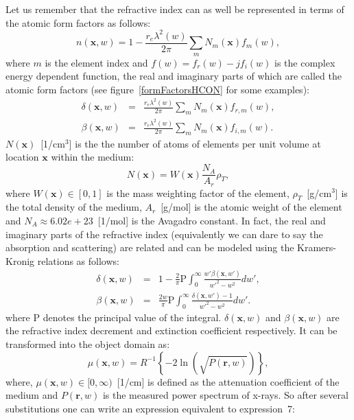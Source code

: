 \documentclass[12pt]{article}
\begin{document}
Let us remember that the refractive index can as well be represented in terms of the atomic form factors as follows:
\begin{equation}
 n(\textbf{x},w) = 1-\frac{r_e\lambda^2(w)}{2\pi}\sum_m N_m(\textbf{x})f_m(w),
 \label{formfactor}
\end{equation}
where $m$ is the element index and $f(w)=f_r(w)-jf_i(w)$ is the complex energy dependent function, the real and imaginary parts of which are called the atomic form factors (see figure~\ref{formFactorsHCON} for some examples):
\begin{eqnarray}
 \delta(\textbf{x},w) &=& \frac{r_e\lambda^2(w)}{2\pi}\sum_m N_m(\textbf{x})f_{r,m}(w),
 \label{delta}\\
 \beta(\textbf{x},w) &=& \frac{r_e\lambda^2(w)}{2\pi}\sum_m N_m(\textbf{x})f_{i,m}(w).
 \label{beta}
\end{eqnarray}
$N(\textbf{x})$~[1/cm$^3$] is the the number of atoms of elements per unit volume at location $\textbf{x}$ within the medium:
\begin{equation}
 N(\textbf{x})=W(\textbf{x})\frac{N_A}{A_r}\rho_{T},
\end{equation} 
where $W(\textbf{x})\in[0,1]$ is the mass weighting factor of the element, $\rho_{T}$~[g/cm$^3$] is the total density of the medium, $A_r$~[g/mol] is the atomic weight of the element and $N_A\approx6.02e+23$~[1/mol] is the Avagadro constant. In fact, the real and imaginary parts of the refractive index (equivalently we can dare to say the absorption and scattering) are related and can be modeled using the Kramers-Kronig relations as follows:
\begin{eqnarray}
 \delta(\textbf{x},w) &=& 1-\frac{2}{\pi}\mathrm{P} \int_0^\infty\frac{w'\beta(\textbf{x},w')}{w'^2-w^2}dw', \label{kk1}\\
 \beta(\textbf{x},w) &=& \frac{2w}{\pi}\mathrm{P} \int_0^\infty\frac{\delta(\textbf{x},w')-1}{w'^2-w^2}dw'.
 \label{kk2}
\end{eqnarray}
where $\mathrm{P}$ denotes the principal value of the integral. $\delta(\textbf{x},w)$ and $\beta(\textbf{x},w)$ are the refractive index decrement and extinction coefficient respectively. It can be transformed into the object domain as:
\begin{equation}
 \mu(\textbf{x},w) = R^{-1}\left\lbrace-2\ln\left(\sqrt{P(\textbf{r},w)}\right)\right\rbrace,
 \label{mu1}
\end{equation}
where, $\mu(\textbf{x},w)\in[0,\infty)$~[1/cm] is defined as the attenuation coefficient of the medium and $P(\textbf{r},w)$ is the measured power spectrum of x-rays. So after several substitutions one can write an expression equivalent to expression~7:
\end{document}
